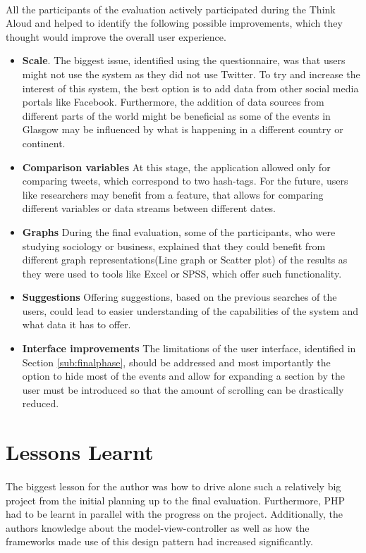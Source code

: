 \documentclass{l4proj}
\begin{document}
\paragraph{}
All the participants of the evaluation actively participated during the Think Aloud and helped to identify the following possible improvements, which they thought would improve the overall user experience.
\begin{itemize}
	\item \textbf{Scale}. The biggest issue, identified using the questionnaire, was that users might not use the system as they did not use Twitter. To try and increase the interest of this system, the best option is to add data from other social media portals like Facebook. Furthermore, the addition of data sources from different parts of the world might be beneficial as some of the events in Glasgow may be influenced by what is happening in a different country or continent.
	\item \textbf{Comparison variables} At this stage, the application allowed only for comparing tweets, which correspond to two hash-tags. For the future, users like researchers may benefit from a feature, that allows for comparing different variables or data streams between different dates.
	\item \textbf{Graphs} During the final evaluation, some of the participants, who were studying sociology or business, explained that they could benefit from different graph representations(Line graph or Scatter plot) of the results as they were used to tools like Excel or SPSS, which offer such functionality.  
	\item \textbf{Suggestions} Offering suggestions, based on the previous searches of the users, could lead to easier understanding of the capabilities of the system and what data it has to offer.
	\item \textbf{Interface improvements} The limitations of the user interface, identified in Section \ref{sub:finalphase}, should be addressed and most importantly the option to hide most of the events and allow for expanding a section by the user must be introduced so that the amount of scrolling can be drastically reduced.    
\end{itemize}

\section{Lessons Learnt}
\paragraph{}
The biggest lesson for the author was how to drive alone such a relatively big project from the initial planning up to the final evaluation. Furthermore, PHP had to be learnt in parallel with the progress on the project. Additionally, the authors knowledge about the model-view-controller as well as how the frameworks made use of this design pattern had increased significantly. 
\end{document}
